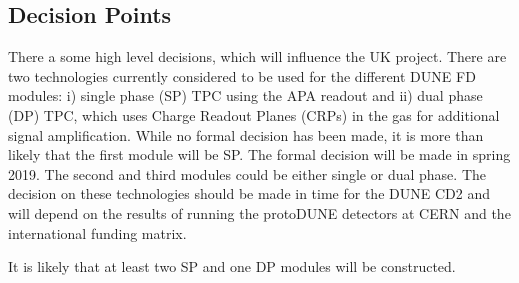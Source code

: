 \subsection{Decision Points}

There a some high level decisions, which will influence the UK project. There are two technologies currently considered to be used for the different DUNE FD modules: i) single phase (SP) TPC using the APA readout and ii) dual phase (DP) TPC, which uses Charge Readout Planes (CRPs) in the gas for additional signal amplification. While no formal decision has been made, it is more than likely that the first module will be SP. The formal decision will be made in spring 2019. The second and third modules could be either single or dual phase. The decision on these technologies should be made in time for the DUNE CD2 and will depend on the results of running the protoDUNE detectors at CERN and the international funding matrix. 

It is likely that at least two SP and one DP modules will be constructed.

